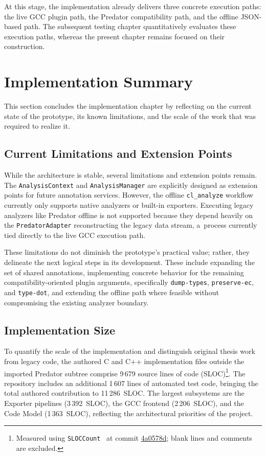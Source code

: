 \documentclass[xpsejal00-gcc-plugin.tex]{subfiles}
\begin{document}
At this stage, the implementation already delivers three concrete execution paths: the live GCC plugin path, the Predator compatibility path, and the offline JSON-based path.
The subsequent testing chapter quantitatively evaluates these execution paths, whereas the present chapter remains focused on their construction.

\section{Implementation Summary}\label{sec:implementation-summary}

This section concludes the implementation chapter by reflecting on the current state of the prototype, its known limitations, and the scale of the work that was required to realize it.

\subsection*{Current Limitations and Extension Points}\label{sub:implementation-limitations}

While the architecture is stable, several limitations and extension points remain.
The \texttt{AnalysisContext} and \texttt{AnalysisManager} are explicitly designed as extension points for future annotation services.
However, the offline \texttt{cl\_analyze} workflow currently only supports native analyzers or built-in exporters.
Executing legacy analyzers like Predator offline is not supported because they depend heavily on the \texttt{PredatorAdapter} reconstructing the legacy data stream, a~process currently tied directly to the live GCC execution path.

These limitations do not diminish the prototype's practical value; rather, they delineate the next logical steps in its development.
These include expanding the set of shared annotations, implementing concrete behavior for the remaining compatibility-oriented plugin arguments, specifically \texttt{dump-types}, \texttt{preserve-ec}, and \texttt{type-dot}, and extending the offline path where feasible without compromising the existing analyzer boundary.

\subsection*{Implementation Size}\label{sub:implementation-size}

To quantify the scale of the implementation and distinguish original thesis work from legacy code, the authored C and C++ implementation files outside the imported Predator subtree comprise 9\,679 source lines of code (SLOC)\footnote{Measured using \texttt{SLOCCount}~\cite{SLOCCount} at commit \href{https://github.com/pseja/gcc-plugin-for-static-analyzer-support/commit/4a0578d}{4a0578d}; blank lines and comments are excluded.}.
The repository includes an additional 1\,607 lines of automated test code, bringing the total authored contribution to 11\,286~SLOC.\@
The largest subsystems are the Exporter pipelines (3\,392~SLOC), the GCC frontend (2\,206~SLOC), and the Code Model (1\,363~SLOC), reflecting the architectural priorities of the project.
\end{document}
